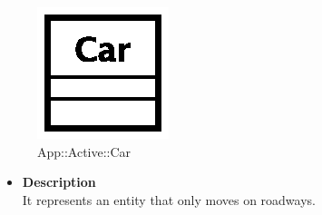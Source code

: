 \begin{figure}[h]
\centering
\includegraphics[scale=0.6,keepaspectratio]{images/solution/car.eps}
\caption{App::Active::Car}
\label{fig:sd-app-car}
\end{figure}
\FloatBarrier
\begin{itemize}
  \item \textbf{Description} \\
It represents an entity that only moves on roadways.
\end{itemize} 
